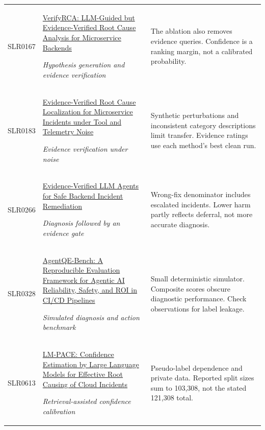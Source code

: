 \begin{longtable}{@{}p{}p{}p{}@{}}
SLR0167 & \href{https://www.researchgate.net/publication/407715364_VerifyRCA_LLM-Guided_but_Evidence-Verified_Root_Cause_Analysis_for_Microservice_Backends}{VerifyRCA: LLM-Guided but Evidence-Verified Root Cause Analysis for Microservice Backends}\par\emph{Hypothesis generation and evidence verification} & The ablation also removes evidence queries. Confidence is a ranking margin, not a calibrated probability. \\
SLR0183 & \href{https://www.researchgate.net/publication/405467638_Evidence-Verified_Root_Cause_Localization_for_Microservice_Incidents_under_Tool_and_Telemetry_Noise}{Evidence-Verified Root Cause Localization for Microservice Incidents under Tool and Telemetry Noise}\par\emph{Evidence verification under noise} & Synthetic perturbations and inconsistent category descriptions limit transfer. Evidence ratings use each method’s best clean run. \\
SLR0266 & \href{https://www.researchgate.net/publication/406279543_Evidence-Verified_LLM_Agents_for_Safe_Backend_Incident_Remediation}{Evidence-Verified LLM Agents for Safe Backend Incident Remediation}\par\emph{Diagnosis followed by an evidence gate} & Wrong-fix denominator includes escalated incidents. Lower harm partly reflects deferral, not more accurate diagnosis. \\
SLR0328 & \href{https://www.researchgate.net/publication/405785833_AgentQE-Bench_A_Reproducible_Evaluation_Framework_for_Agentic_AI_Reliability_Safety_and_ROI_in_CICD_Pipelines}{AgentQE-Bench: A Reproducible Evaluation Framework for Agentic AI Reliability, Safety, and ROI in CI/CD Pipelines}\par\emph{Simulated diagnosis and action benchmark} & Small deterministic simulator. Composite scores obscure diagnostic performance. Check observations for label leakage. \\
SLR0613 & \href{https://arxiv.org/pdf/2309.05833v3}{LM-PACE: Confidence Estimation by Large Language Models for Effective Root Causing of Cloud Incidents}\par\emph{Retrieval-assisted confidence calibration} & Pseudo-label dependence and private data. Reported split sizes sum to 103,308, not the stated 121,308 total. \\
\end{longtable}
\endgroup

